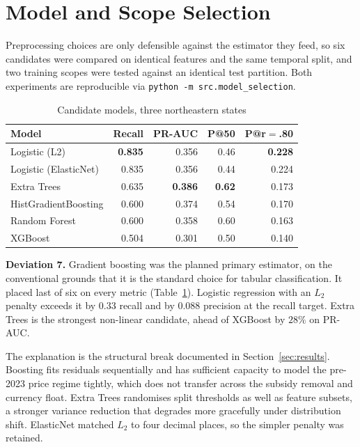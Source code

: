 \documentclass[conference]{IEEEtran}
\begin{document}
\section{Model and Scope Selection}
\label{sec:models}

Preprocessing choices are only defensible against the estimator they feed, so
six candidates were compared on identical features and the same temporal
split, and two training scopes were tested against an identical test
partition. Both experiments are reproducible via
\texttt{python -m src.model\_selection}.

\begin{table}[htbp]
\caption{Candidate models, three northeastern states}
\begin{center}
\footnotesize
\begin{tabular}{@{}lrrrr@{}}
\toprule
\textbf{Model} & \textbf{Recall} & \textbf{PR-AUC} & \textbf{P@50} & \textbf{P@r$=$.80} \\
\midrule
Logistic (L2) & \textbf{0.835} & 0.356 & 0.46 & \textbf{0.228} \\
Logistic (ElasticNet) & 0.835 & 0.356 & 0.44 & 0.224 \\
Extra Trees & 0.635 & \textbf{0.386} & \textbf{0.62} & 0.173 \\
HistGradientBoosting & 0.600 & 0.374 & 0.54 & 0.170 \\
Random Forest & 0.600 & 0.358 & 0.60 & 0.163 \\
XGBoost & 0.504 & 0.301 & 0.50 & 0.140 \\
\bottomrule
\end{tabular}
\label{tab:models}
\end{center}
\end{table}

\textbf{Deviation 7.} Gradient boosting was the planned primary estimator, on
the conventional grounds that it is the standard choice for tabular
classification. It placed last of six on every metric
(Table~\ref{tab:models}). Logistic regression with an $L_2$ penalty exceeds it
by $0.33$ recall and by $0.088$ precision at the recall target. Extra Trees is
the strongest non-linear candidate, ahead of XGBoost by $28\%$ on PR-AUC.

The explanation is the structural break documented in
Section~\ref{sec:results}. Boosting fits residuals sequentially and has
sufficient capacity to model the pre-2023 price regime tightly, which does not
transfer across the subsidy removal and currency float. Extra Trees randomises
split thresholds as well as feature subsets, a stronger variance reduction
that degrades more gracefully under distribution shift. ElasticNet matched
$L_2$ to four decimal places, so the simpler penalty was retained.
\end{document}
